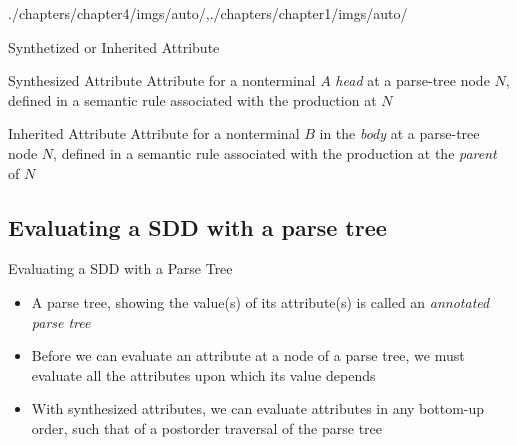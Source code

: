 \begin{graphicspathcontext}{{./chapters/chapter4/imgs/auto/},{./chapters/chapter1/imgs/auto/}}
\begin{bibunit}[apalike]
\begin{frame}{Synthetized or Inherited Attribute}
	\begin{definitionblock}{Synthesized Attribute}
		Attribute for a nonterminal $A$ \emph{head} at a parse-tree node $N$, defined in a semantic rule associated with the production at $N$
	\end{definitionblock}
	\vspace{.5cm}
	\begin{definitionblock}{Inherited Attribute}
		Attribute for a nonterminal $B$ in the \emph{body} at a parse-tree node $N$, defined in a semantic rule associated with the production at the \emph{parent} of $N$
	\end{definitionblock}
\end{frame}

\subsection{Evaluating a SDD with a parse tree}
\subsectiontableofcontentslide

\begin{frame}{Evaluating a SDD with a Parse Tree}
	\vfill
	\begin{itemize}
		\item A parse tree, showing the value(s) of its attribute(s) is called an \emph{annotated parse tree}
		\vspace{1cm}
		\item Before we can evaluate an attribute at a node of a parse tree, we must evaluate all the attributes upon which its value depends
		\vspace{1cm}
		\item With synthesized attributes, we can evaluate attributes in any bottom-up order, such that of a postorder traversal of the parse tree
	\end{itemize}
\end{frame}


\end{bibunit}
\end{graphicspathcontext}
